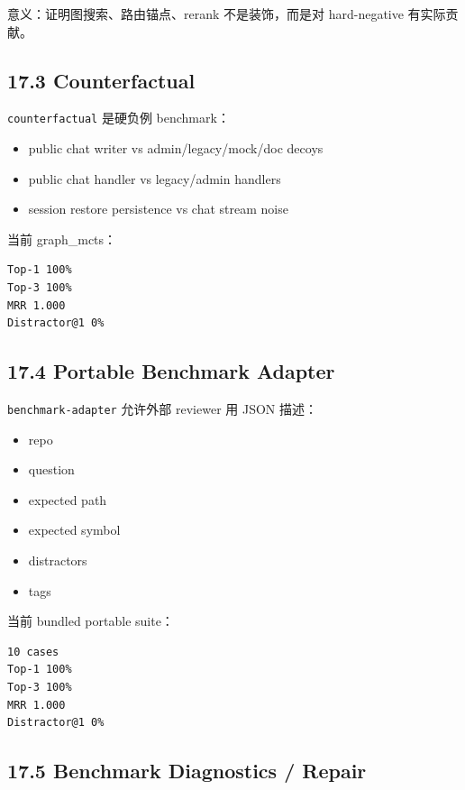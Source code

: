\documentclass[UTF8,12pt,openany]{ctexbook}
\begin{document}
意义：证明图搜索、路由锚点、rerank 不是装饰，而是对 hard-negative 有实际贡献。\par

\subsection{17.3 Counterfactual}

\texttt{counterfactual} 是硬负例 benchmark：\par

\begin{itemize}
\item public chat writer vs admin/legacy/mock/doc decoys
\item public chat handler vs legacy/admin handlers
\item session restore persistence vs chat stream noise
\end{itemize}

当前 graph\_mcts：\par

\begin{lstlisting}
Top-1 100%
Top-3 100%
MRR 1.000
Distractor@1 0%
\end{lstlisting}

\subsection{17.4 Portable Benchmark Adapter}

\texttt{benchmark-adapter} 允许外部 reviewer 用 JSON 描述：\par

\begin{itemize}
\item repo
\item question
\item expected path
\item expected symbol
\item distractors
\item tags
\end{itemize}

当前 bundled portable suite：\par

\begin{lstlisting}
10 cases
Top-1 100%
Top-3 100%
MRR 1.000
Distractor@1 0%
\end{lstlisting}

\subsection{17.5 Benchmark Diagnostics / Repair}
\end{document}
